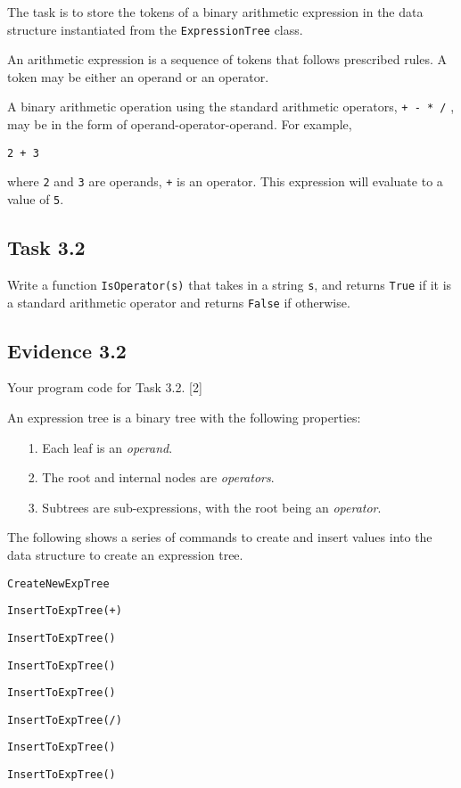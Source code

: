 The task is to store the tokens of a binary arithmetic expression
in the data structure instantiated from the \texttt{ExpressionTree}
class. 

An arithmetic expression is a sequence of tokens that follows prescribed
rules. A token may be either an operand or an operator. 

A binary arithmetic operation using the standard arithmetic operators,
\texttt{+ - {*} /} , may be in the form of operand-operator-operand.
For example, 
\noindent \begin{center}
\texttt{2 + 3 }
\par\end{center}

where \texttt{2} and \texttt{3} are operands, \texttt{+} is an operator.
This expression will evaluate to a value of \texttt{5}. 

\subsection*{Task 3.2 }

Write a function \texttt{IsOperator(s)} that takes in a string \texttt{s},
and returns \texttt{True} if it is a standard arithmetic operator
and returns \texttt{False} if otherwise. 

\subsection*{Evidence 3.2 }

Your program code for Task 3.2. \hfill{}{[}2{]}

An expression tree is a binary tree with the following properties: 
\begin{enumerate}
\item[1.]  Each leaf is an \emph{operand}. 
\item[2.]  The root and internal nodes are \emph{operators}. 
\item[3.]  Subtrees are sub-expressions, with the root being an \emph{operator}.
\end{enumerate}
The following shows a series of commands to create and insert values
into the data structure to create an expression tree. 

\begin{minipage}[t]{0.5\columnwidth}%
\texttt{CreateNewExpTree }

\texttt{InsertToExpTree(\textquotedbl +\textquotedbl ) }

\texttt{InsertToExpTree(\textquotedbl{*}\textquotedbl ) }

\texttt{InsertToExpTree(\textquotedbl ) }

\texttt{InsertToExpTree(\textquotedbl ) }

\texttt{InsertToExpTree(\textquotedbl /\textquotedbl ) }

\texttt{InsertToExpTree(\textquotedbl )}

\texttt{InsertToExpTree(\textquotedbl )}%
\end{minipage}

